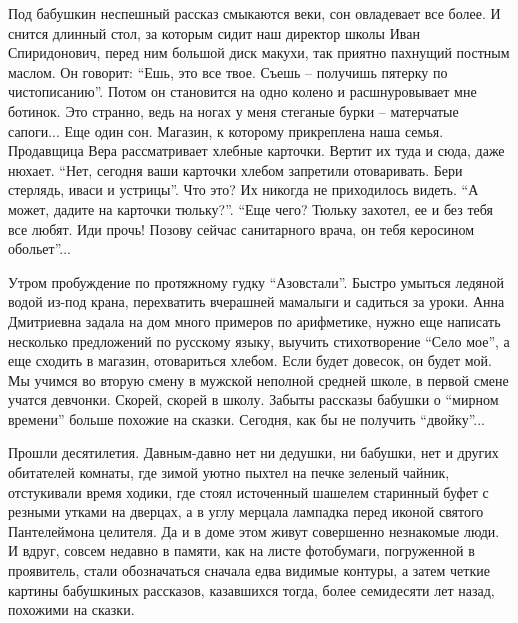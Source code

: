 Под бабушкин неспешный рассказ смыкаются веки, сон овладевает все более. И
снится длинный стол, за которым сидит наш директор школы Иван Спиридонович,
перед ним большой диск макухи, так приятно пахнущий постным маслом. Он говорит:
\enquote{Ешь, это все твое. Съешь – получишь пятерку по чистописанию}. Потом он
становится на одно колено и расшнуровывает мне ботинок. Это странно, ведь на
ногах у меня стеганые бурки – матерчатые сапоги... Еще один сон. Магазин, к
которому прикреплена наша семья. Продавщица Вера рассматривает хлебные
карточки. Вертит их туда и сюда, даже нюхает. \enquote{Нет, сегодня ваши карточки
хлебом запретили отоваривать. Бери стерлядь, иваси и устрицы}. Что это? Их
никогда не приходилось видеть. \enquote{А может, дадите на карточки тюльку?}.  \enquote{Еще
чего? Тюльку захотел, ее и без тебя все любят. Иди прочь! Позову сейчас
санитарного врача, он тебя керосином обольет}...

Утром пробуждение по протяжному гудку \enquote{Азовстали}.  Быстро умыться ледяной
водой из-под крана, перехватить вчерашней мамалыги и садиться за уроки. Анна
Дмитриевна задала на дом много примеров по арифметике, нужно еще написать
несколько предложений по русскому языку, выучить стихотворение \enquote{Село мое}, а
еще сходить в магазин, отовариться хлебом. Если будет довесок, он будет мой. Мы
учимся во вторую смену в мужской неполной средней школе, в первой смене учатся
девчонки. Скорей, скорей в школу. Забыты рассказы бабушки о \enquote{мирном времени}
больше похожие на сказки. Сегодня, как бы не получить \enquote{двойку}...

Прошли десятилетия. Давным-давно нет  ни дедушки, ни бабушки, нет и других
обитателей комнаты, где зимой  уютно пыхтел на печке зеленый чайник,
отстукивали время ходики, где стоял источенный шашелем старинный буфет с
резными утками на дверцах, а в углу мерцала лампадка перед иконой святого
Пантелеймона целителя. Да и в доме этом живут совершенно незнакомые люди. И
вдруг, совсем недавно в памяти, как на листе фотобумаги, погруженной в
проявитель, стали обозначаться сначала едва видимые контуры, а затем  четкие
картины бабушкиных рассказов, казавшихся тогда, более семидесяти лет назад,
похожими на сказки.
